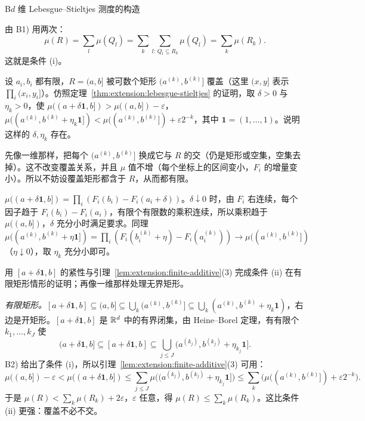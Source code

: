 \begin{probleme}{B}{$d$ 维 Lebesgue--Stieltjes 测度的构造}
\begin{questions}
\begin{solution}
由 B1) 用两次：
\[
\mu(R)=\sum_l\mu(Q_l)=\sum_k\sum_{l:\,Q_l\subseteq R_k}\mu(Q_l)=\sum_k\mu(R_k).
\]
这就是条件 (i)。
\end{solution}
\item 设 $a_i,b_i$ 都有限，$R=(a,b]$ 被可数个矩形 $(a^{(k)},b^{(k)}]$ 覆盖（这里 $(x,y]$ 表示 $\prod_i(x_i,y_i]$）。仿照定理~\ref{thm:extension:lebesgue-stieltjes} 的证明，取 $\delta>0$ 与 $\eta_k>0$，使 $\mu((a+\delta\mathbf 1,b])>\mu((a,b])-\varepsilon$，$\mu((a^{(k)},b^{(k)}+\eta_k\mathbf 1])<\mu((a^{(k)},b^{(k)}])+\varepsilon2^{-k}$，其中 $\mathbf 1=(1,\dots,1)$。说明这样的 $\delta,\eta_k$ 存在。
\begin{solution}
先像一维那样，把每个 $(a^{(k)},b^{(k)}]$ 换成它与 $R$ 的交（仍是矩形或空集，空集去掉）。这不改变覆盖关系，并且 $\mu$ 值不增（每个坐标上的区间变小，$F_i$ 的增量变小）。所以不妨设覆盖矩形都含于 $R$，从而都有限。

$\mu((a+\delta\mathbf 1,b])=\prod_i(F_i(b_i)-F_i(a_i+\delta))$。$\delta\downarrow0$ 时，由 $F_i$ 右连续，每个因子趋于 $F_i(b_i)-F_i(a_i)$，有限个有限数的乘积连续，所以乘积趋于 $\mu((a,b])$，$\delta$ 充分小时满足要求。同理 $\mu((a^{(k)},b^{(k)}+\eta\mathbf 1])=\prod_i(F_i(b_i^{(k)}+\eta)-F_i(a_i^{(k)}))\to\mu((a^{(k)},b^{(k)}])$（$\eta\downarrow0$），取 $\eta_k$ 充分小即可。
\end{solution}
\item 用 $[a+\delta\mathbf 1,b]$ 的紧性与引理~\ref{lem:extension:finite-additive}(3) 完成条件 (ii) 在有限矩形情形的证明；再像一维那样处理无界矩形。
\begin{solution}
\emph{有限矩形。}$[a+\delta\mathbf 1,b]\subseteq(a,b]\subseteq\bigcup_k(a^{(k)},b^{(k)}]\subseteq\bigcup_k(a^{(k)},b^{(k)}+\eta_k\mathbf 1)$，右边是开矩形。$[a+\delta\mathbf 1,b]$ 是 $\mathbb{R}^d$ 中的有界闭集，由 Heine--Borel 定理，有有限个 $k_1,\dots,k_J$ 使
\[
(a+\delta\mathbf 1,b]\subseteq[a+\delta\mathbf 1,b]\subseteq\bigcup_{j\leqslant J}(a^{(k_j)},b^{(k_j)}+\eta_{k_j}\mathbf 1].
\]
B2) 给出了条件 (i)，所以引理~\ref{lem:extension:finite-additive}(3) 可用：
\[
\mu((a,b])-\varepsilon<\mu((a+\delta\mathbf 1,b])\leqslant\sum_{j\leqslant J}\mu\bigl((a^{(k_j)},b^{(k_j)}+\eta_{k_j}\mathbf 1]\bigr)\leqslant\sum_k\bigl(\mu((a^{(k)},b^{(k)}])+\varepsilon2^{-k}\bigr).
\]
于是 $\mu(R)<\sum_k\mu(R_k)+2\varepsilon$，$\varepsilon$ 任意，得 $\mu(R)\leqslant\sum_k\mu(R_k)$。这比条件 (ii) 更强：覆盖不必不交。


\end{solution}
\end{questions}
\end{probleme}
